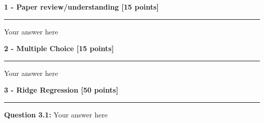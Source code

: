 \documentclass[10pt]{article}
\begin{document}
\vspace{-0.25cm}
\noindent\textbf{1 - Paper review/understanding [15 points]}\hrule 
\vspace{0.25cm}
\noindent Your answer here

\vspace{0.25cm}
\noindent\textbf{2 - Multiple Choice [15 points]}\hrule 
\vspace{0.25cm}
\noindent Your answer here

\vspace{0.25cm}
\noindent\textbf{3 - Ridge Regression [50 points]}\hrule 
\vspace{0.25cm}
\noindent\textbf{Question 3.1:} Your answer here
\end{document}
